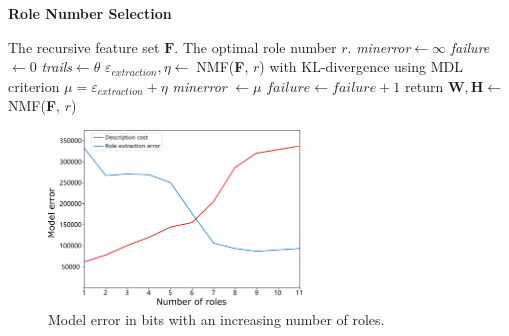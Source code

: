 \documentclass[a4paper,fleqn]{cas-sc}
\begin{document}
\begin{algorithm}[!htb]
    \caption{\textbf{Role Number Selection}}
    \label{alg:ALG2}
    \begin{algorithmic}
    \Require The recursive feature set  $\textbf{F}$.
    \Ensure The optimal role number $r$.
    \State \textit{minerror}$\gets \infty$
    \State \textit{failure}$\gets 0$
    \State \textit{trails}$\gets \theta$
    \State$\varepsilon_{extraction} , \eta\gets  \;$NMF(\textbf{F}, $r$) with KL-divergence using MDL criterion
    \State$\mu = \varepsilon_{extraction} + \eta$
            \State \textit{minerror} $\gets \mu$
        \Else
            \State $\textit{failure} \gets \textit{failure}+1$
        \EndIf
            \State return $\textbf{W}, \textbf{H} \gets \;$NMF(\textbf{F}, $r$)
        \EndIf
    \EndFor
    \end{algorithmic}\label{alg:alg2}
\end{algorithm}

\begin{figure}[!htb]
  \centering
  \includegraphics[width=0.6\textwidth]{figs/kl_divergence_role_intepretation.pdf}
  \caption{Model error in bits with an increasing number of roles.}\label{fig:kl_divergence_role_intepretation}
\end{figure}
\end{document}
